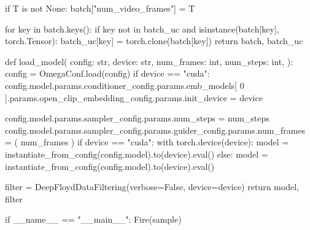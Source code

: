     if T is not None:
        batch["num_video_frames"] = T

    for key in batch.keys():
        if key not in batch_uc and isinstance(batch[key], torch.Tensor):
            batch_uc[key] = torch.clone(batch[key])
    return batch, batch_uc


def load_model(
    config: str,
    device: str,
    num_frames: int,
    num_steps: int,
):
    config = OmegaConf.load(config)
    if device == "cuda":
        config.model.params.conditioner_config.params.emb_models[
            0
        ].params.open_clip_embedding_config.params.init_device = device

    config.model.params.sampler_config.params.num_steps = num_steps
    config.model.params.sampler_config.params.guider_config.params.num_frames = (
        num_frames
    )
    if device == "cuda":
        with torch.device(device):
            model = instantiate_from_config(config.model).to(device).eval()
    else:
        model = instantiate_from_config(config.model).to(device).eval()

    filter = DeepFloydDataFiltering(verbose=False, device=device)
    return model, filter


if __name__ == "__main__":
    Fire(sample)
